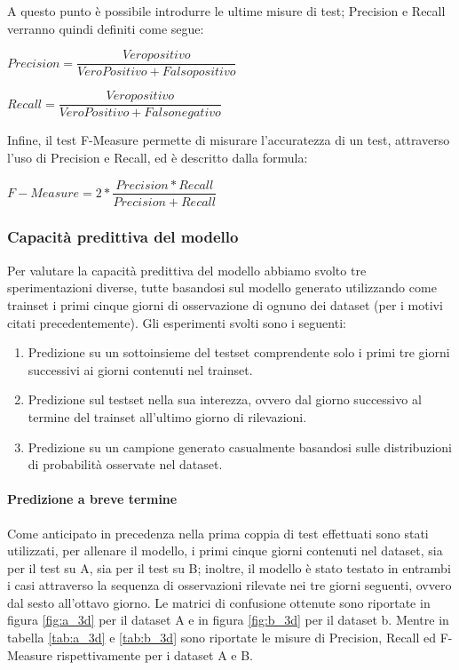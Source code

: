 \documentclass[10pt,a4paper]{article}
\begin{document}
	A questo punto è possibile introdurre le ultime misure di test; Precision e Recall verranno quindi definiti come segue:
	
	\begin{center}
		$ Precision = \dfrac{Veropositivo}{VeroPositivo + Falsopositivo} $
	\end{center}

	\begin{center}
		$ Recall = \dfrac{Veropositivo}{VeroPositivo + Falsonegativo} $
	\end{center}

	Infine, il test F-Measure permette di misurare l'accuratezza di un test, attraverso l'uso di Precision e Recall, ed è descritto dalla formula:
	
		\begin{center}
		$ F-Measure = 2 * \dfrac{Precision * Recall}{Precision + Recall} $
	\end{center}
	
	
	
	\subsubsection{Capacità predittiva del modello}
	
	Per valutare la capacità predittiva del modello abbiamo svolto tre sperimentazioni diverse, tutte basandosi sul modello generato utilizzando come trainset i primi cinque giorni di osservazione di ognuno dei dataset (per i motivi citati precedentemente). Gli esperimenti svolti sono i seguenti:
	\begin{enumerate}
	    \item Predizione su un sottoinsieme del testset comprendente solo i primi tre giorni successivi ai giorni contenuti nel trainset.
	    \item Predizione sul testset nella sua interezza, ovvero dal giorno successivo al termine del trainset all'ultimo giorno di rilevazioni.
	    \item Predizione su un campione generato casualmente basandosi sulle distribuzioni di probabilità osservate nel dataset.
	\end{enumerate}
	
	\paragraph{Predizione a breve termine}
	
	Come anticipato in precedenza nella prima coppia di test effettuati sono stati utilizzati, per allenare il modello, i primi cinque giorni contenuti nel dataset, sia per il test su A, sia per il test su B; inoltre, il modello è stato testato in entrambi i casi attraverso la sequenza di osservazioni rilevate nei tre giorni seguenti, ovvero dal sesto all'ottavo giorno. Le matrici di confusione ottenute sono riportate in figura \ref{fig:a_3d} per il dataset A e in figura \ref{fig:b_3d} per il dataset b. Mentre in tabella \ref{tab:a_3d} e \ref{tab:b_3d} sono riportate le misure di Precision, Recall ed F-Measure rispettivamente per i dataset A e B.
\end{document}
